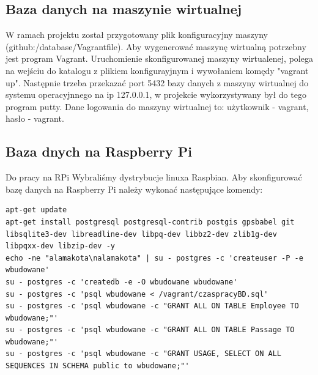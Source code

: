 \subsection{Baza danych na maszynie wirtualnej}
W ramach projektu został przygotowany plik konfiguracyjny maszyny\\ (github:/database/Vagrantfile). Aby wygenerować maszynę wirtualną potrzebny jest program Vagrant. Uruchomienie skonfigurowanej maszyny wirtualenej, polega na wejściu do katalogu z plikiem konfigurayjnym i wywołaniem komędy "vagrant up". Następnie trzeba przekazać port 5432 bazy danych z maszyny wirtualnej do systemu operacyjnnego na ip 127.0.0.1, w projekcie wykorzystywany był do tego program putty.
Dane logowania do maszyny wirtualnej to: użytkownik - vagrant, hasło - vagrant.
\subsection{Baza dnych na Raspberry Pi}
Do pracy na RPi Wybraliśmy dystrybucje linuxa Raspbian.
Aby skonfigurować bazę danych na Raspberry Pi należy wykonać następujące komendy:
\lstset{language=bash, breaklines=true}
\begin{lstlisting}
apt-get update
apt-get install postgresql postgresql-contrib postgis gpsbabel git libsqlite3-dev libreadline-dev libpq-dev libbz2-dev zlib1g-dev libpqxx-dev libzip-dev -y
echo -ne "alamakota\nalamakota" | su - postgres -c 'createuser -P -e wbudowane'
su - postgres -c 'createdb -e -O wbudowane wbudowane'
su - postgres -c 'psql wbudowane < /vagrant/czaspracyBD.sql'
su - postgres -c 'psql wbudowane -c "GRANT ALL ON TABLE Employee TO wbudowane;"'
su - postgres -c 'psql wbudowane -c "GRANT ALL ON TABLE Passage TO wbudowane;"'
su - postgres -c 'psql wbudowane -c "GRANT USAGE, SELECT ON ALL SEQUENCES IN SCHEMA public to wbudowane;"'
\end{lstlisting}



